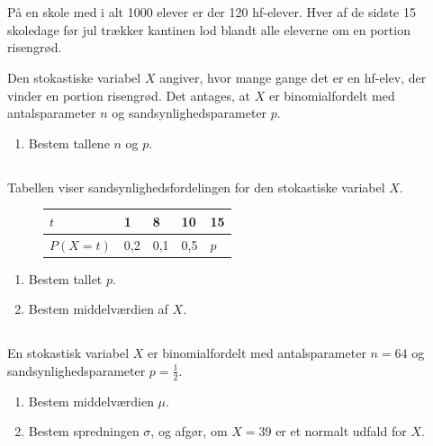 \documentclass[10pt,a4paper,table]{article}
\begin{document}
\thispagestyle{plain}

\section{}
\subsection{}
På en skole med i alt 1000 elever er der 120 hf-elever. Hver af de sidste 15 skoledage før jul trækker kantinen lod blandt alle eleverne om en portion risengrød.

Den stokastiske variabel $X$ angiver, hvor mange gange det er en hf-elev, der vinder en portion risengrød. Det antages, at $X$ er binomialfordelt med antalsparameter $n$ og sandsynlighedsparameter $p$.

\begin{enumerate}
    \item Bestem tallene $n$ og $p$.
\end{enumerate}

\subsection{}
Tabellen viser sandsynlighedsfordelingen for den stokastiske variabel $X$.

\begin{figure}[h!]
\centering\renewcommand{\arraystretch}{1.5}
\begin{tabularx}{0.7\textwidth}{|l|b|b|b|b|}
	\hline 
	\cellcolor{frbgreenl} $t$ & 1 & 8 & 10 & 15 \\\hline
	\cellcolor{frbgreenl} $P(X=t)$ & 0,2 & 0,1 & 0,5 & $p$ \\\hline
\end{tabularx}
\end{figure}

\begin{enumerate}
	\item Bestem tallet $p$.
	\item Bestem middelværdien af $X$.
\end{enumerate}

\subsection{}
En stokastisk variabel $X$ er binomialfordelt med antalsparameter $n = 64$ og sandsynlighedsparameter $p = \tfrac{1}{2}$.

\begin{enumerate}
    \item Bestem middelværdien $\mu$.
    \item Bestem spredningen $\sigma$, og afgør, om $X = 39$ er et normalt udfald for $X$.
\end{enumerate}
\end{document}
